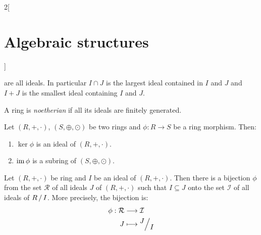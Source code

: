 \documentclass[../../../main.tex]{subfiles}
\begin{document}
\begin{multicols}{2}[\section{Algebraic structures}]
\begin{prop}
    are all ideals. In particular $I\cap J$ is the largest ideal contained in $I$ and $J$ and $I+J$ is the smallest ideal containing $I$ and $J$.
\end{prop}
\begin{definition}
    A ring is \textit{noetherian} if all its ideals are finitely generated.
\end{definition}
\begin{lemma}
    Let $(R,+,\cdot)$, $(S,\oplus,\odot)$ be two rings and $\phi:R\rightarrow S$ be a ring morphism. Then:
\begin{enumerate}
    \item $\ker\phi$ is an ideal of $(R,+,\cdot)$.
    \item $\operatorname{im}\phi$ is a subring of $(S,\oplus,\odot)$.
\end{enumerate}
\end{lemma}
\begin{theorem}
    Let $(R,+,\cdot)$ be ring and $I$ be an ideal of $(R,+,\cdot)$. Then there is a bijection $\phi$ from the set $\mathcal{R}$ of all ideals $J$ of $(R,+,\cdot)$ such that $I\subseteq J$ onto the set $\mathcal{I}$ of all ideals of $\quot{R}{I}$. More precisely, the bijection is:
\begin{align*}
    \phi:\mathcal{R}&\longrightarrow\mathcal{I}\\
    J&\longmapsto\quot{J}{I}
\end{align*}
\end{theorem}

\end{multicols}
\end{document}
